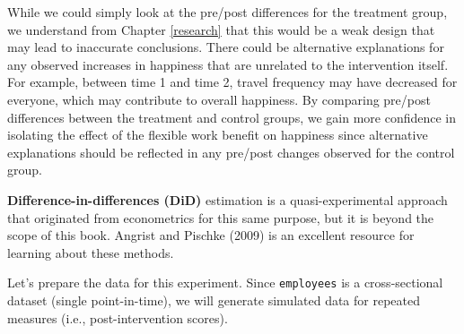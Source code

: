 \documentclass[]{book}
\begin{document}
While we could simply look at the pre/post differences for the treatment group, we understand from Chapter \ref{research} that this would be a weak design that may lead to inaccurate conclusions. There could be alternative explanations for any observed increases in happiness that are unrelated to the intervention itself. For example, between time 1 and time 2, travel frequency may have decreased for everyone, which may contribute to overall happiness. By comparing pre/post differences between the treatment and control groups, we gain more confidence in isolating the effect of the flexible work benefit on happiness since alternative explanations should be reflected in any pre/post changes observed for the control group.

\textbf{Difference-in-differences (DiD)} estimation is a quasi-experimental approach that originated from econometrics for this same purpose, but it is beyond the scope of this book. Angrist and Pischke (2009) is an excellent resource for learning about these methods.

Let's prepare the data for this experiment. Since \texttt{employees} is a cross-sectional dataset (single point-in-time), we will generate simulated data for repeated measures (i.e., post-intervention scores).
\end{document}
